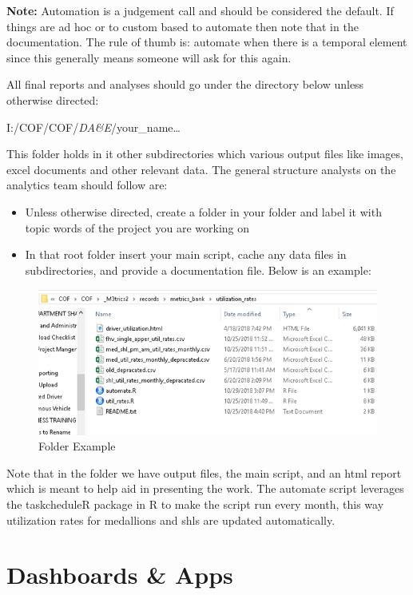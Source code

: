 \documentclass[
]{book}
\begin{document}
\textbf{Note:} Automation is a judgement call and should be considered the default. If things are ad hoc or to custom based to automate then note that in the documentation. The rule of thumb is: automate when there is a temporal element since this generally means someone will ask for this again.

All final reports and analyses should go under the directory below unless otherwise directed:

I:/COF/COF/\emph{DA\&E}/your\_name\ldots{}

This folder holds in it other subdirectories which various output files like images, excel documents and other relevant data. The general structure analysts on the analytics team should follow are:

\begin{itemize}
\item
  Unless otherwise directed, create a folder in your folder and label it with topic words of the project you are working on
\item
  In that root folder insert your main script, cache any data files in subdirectories, and provide a documentation file. Below is an example:
\end{itemize}

\begin{figure}
\centering
\includegraphics{my_files/folder_ex.png}
\caption{Folder Example}
\end{figure}

Note that in the folder we have output files, the main script, and an html report which is meant to help aid in presenting the work. The automate script leverages the taskcheduleR package in R to make the script run every month, this way utilization rates for medallions and shls are updated automatically.

\hypertarget{dashboards-apps}{%
\section{Dashboards \& Apps}\label{dashboards-apps}}
\end{document}
